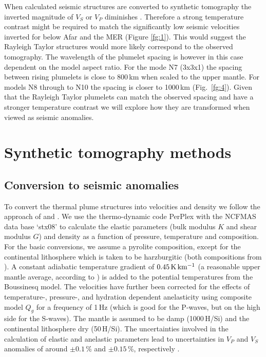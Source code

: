 \documentclass[a4paper,10pt,twocolumn]{paper}
\begin{document}
When calculated seismic structures are converted to synthetic tomography the inverted magnitude of $V_{S}$ or $V_{P}$ diminishes \citep[e.g.][]{goes-etal-2012,maguire-etal-2018}. Therefore a strong temperature contrast might be required to match the significantly low seismic velocities inverted for below Afar and the MER (Figure \ref{fg:1}). This would suggest the Rayleigh Taylor structures would more likely correspond to the observed tomography. The wavelength of the plumelet spacing is however in this case dependent on the model aspect ratio. For the mode N7 (3x3x1) the spacing between rising plumelets is close to 800\,km when scaled to the upper mantle. For models N8 through to N10 the spacing is closer to 1000\,km (Fig.~\ref{fg:4}). Given that the Rayleigh Taylor plumelets can match the observed spacing and have a stronger temperature contrast we will explore how they are transformed when viewed as seismic anomalies.

\section{Synthetic tomography methods}

\subsection{Conversion to seismic anomalies}

To convert the thermal plume structures into velocities and density we follow the approach of \cite{cobden-etal-2008} and \cite{styles-etal-2011}. We use the thermo-dynamic code PerPlex \citep{connolly-2005} with the NCFMAS data base ‘stx08’ \citep{xu-etal-2008} to calculate the elastic parameters (bulk modulus $K$ and shear modulus $G$) and density as a function of pressure, temperature and composition. For the basic conversions, we assume a pyrolite composition, except for the continental lithosphere which is taken to be harzburgitic (both compositions from \citealp{xu-etal-2008}). A constant adiabatic temperature gradient of $0.45\rm\,K\,km^{-1}$ (a reasonable upper mantle average, according to \citealp{styles-etal-2011}) is added to the potential temperatures from the Boussinesq model. The velocities have further been corrected for the effects of temperature-, pressure-, and hydration dependent anelasticity using composite model $Q_{g}$ \citep{goes-etal-2012,vanwijk-etal-2008} for a frequency of 1\,Hz (which is good for the P-waves, but on the high side for the S-waves). The mantle is assumed to be damp (1000\,H/Si) and the continental lithosphere dry (50\,H/Si). The uncertainties involved in the calculation of elastic and anelastic parameters lead to uncertainties in $V_{P}$ and $V_{S}$ anomalies of around $\pm0.1$\,\% and $\pm 0.15$\,\%, respectively \citep{cammarano-etal-2003,styles-etal-2011}.
\end{document}

